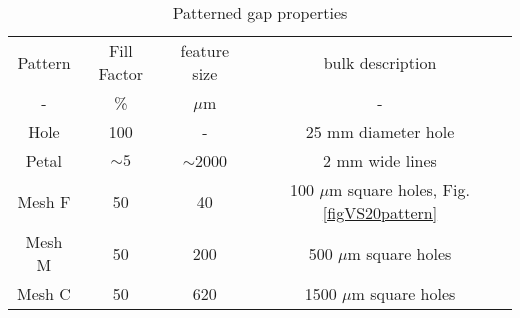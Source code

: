 \begin{table}[h!]
\caption{Patterned gap properties \label{tbl_meshPatterns}}
\begin{center}
    \begin{tabular}{ c c c c }
    \hline
    Pattern & Fill Factor & feature size & bulk description \\ 
    - & \% & $\mu$m & - \\ 
    \hline
    Hole   & 100     &  -         & 25 mm diameter hole \\     
    Petal  & $\sim5$ & $\sim$2000 & 2 mm wide lines \\         
    Mesh F & 50      &         40 & 100 $\mu$m square holes, Fig. \ref{figVS20pattern}\\ 
    Mesh M & 50      & 200        & 500 $\mu$m square holes\\ 
    Mesh C & 50      & 620        & 1500 $\mu$m square holes\\     
        \hline
    \end{tabular}
\end{center}
\end{table}